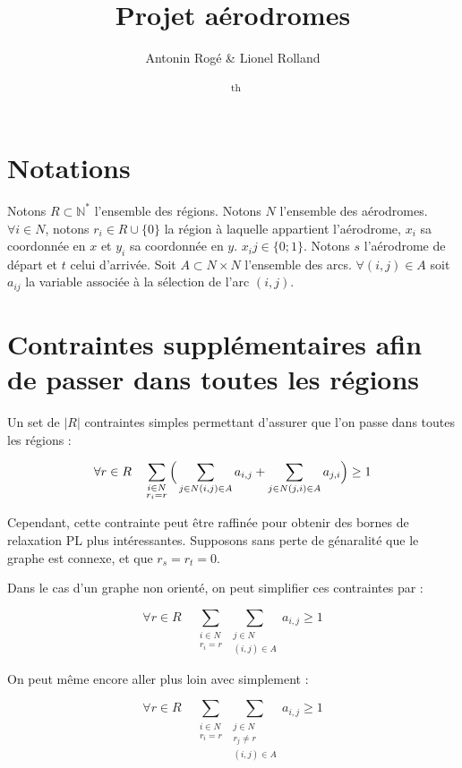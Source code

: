 \documentclass[12pt,a4paper]{article}
\title{Projet aérodromes}
\author{Antonin Rogé \& Lionel Rolland}
\date{\monthname \ \the\day\textsuperscript{th} \the\year}
\begin{document}
\maketitle

\newpage

\tableofcontents

\newpage

\section{Notations}

Notons $R \subset \mathbb{N}^*$ l'ensemble des régions.
Notons $N$ l'ensemble des aérodromes. $\forall i \in N$, notons $r_i \in R \cup \{0\}$ la région
à laquelle appartient l'aérodrome, $x_i$ sa coordonnée en $x$ et $y_i$ sa
coordonnée en $y$. $x_ij \in \{0; 1\}$. Notons $s$ l'aérodrome de départ et $t$ celui d'arrivée.
Soit $A \subset N \times N$ l'ensemble des arcs. $\forall (i,j) \in A$ soit
$a_{ij}$ la variable associée à la sélection de l'arc $(i, j)$.

\section{Contraintes supplémentaires afin de passer dans toutes les régions}

Un set de $|R|$ contraintes simples permettant d'assurer que l'on passe dans toutes les régions :

$$\forall r \in R \quad \sum_{\substack{i \in N \\ r_i = r}}
\Big(\sum_{j \in N \\ (i, j) \in A} a_{i, j} + \sum_{j \in N \\ (j, i) \in A} a_{j, i} \Big) \geq 1$$

Cependant, cette contrainte peut être raffinée pour obtenir des bornes de relaxation PL plus intéressantes.
Supposons sans perte de génaralité que le graphe est connexe, et que $r_s = r_t = 0$.

Dans le cas d'un graphe non orienté, on peut simplifier ces contraintes par :

$$\forall r \in R \quad \sum_{\substack{i \in N \\ r_i = r}} \sum_{\substack{j \in N \\ (i, j) \in A}} a_{i, j} \geq 1$$

On peut même encore aller plus loin avec simplement :

$$\forall r \in R \quad \sum_{\substack{i \in N \\ r_i = r}} \sum_{\substack{j \in N \\ r_j \neq r \\ (i, j) \in A}} a_{i, j} \geq 1$$
\end{document}
